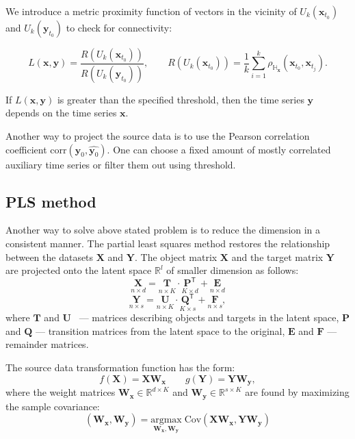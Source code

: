 \documentclass[bst/sn-mathphys]{sn-jnl}%
\newcommand{\bx}{\ensuremath{\mathbf{x}}}
\newcommand{\by}{\mathbf{y}}
\newcommand{\bT}{\mathbf{T}}
\newcommand{\bX}{\mathbf{X}}
\newcommand{\bW}{\mathbf{W}}
\newcommand{\bY}{\mathbf{Y}}
\newcommand{\bU}{\mathbf{U}}
\newcommand{\bQ}{\mathbf{Q}}
\newcommand{\bP}{\mathbf{P}}
\newcommand{\bE}{\mathbf{E}}
\newcommand{\bF}{\mathbf{F}}
\newcommand{\dH}{\mathbb{H}}
\newcommand{\dR}{\mathbb{R}}
\renewcommand{\T}{^{\mathsf{T}}}
\theoremstyle{thmstyleone}%
\theoremstyle{thmstyletwo}%
\theoremstyle{thmstylethree}%
\begin{document}
We introduce a metric proximity function of vectors in the vicinity of $U_k(\bx_{t_0})$ and $U_k(\by_{t_0})$ to check for connectivity:

\begin{equation}
	L(\bx, \by) = \dfrac{R(U_k(\bx_{t_0}))}{R(U_k(\by_{t_0}))}, \qquad R(U_k(\bx_{t_0})) = \dfrac{1}{k} \sum\limits_{i=1}^k \rho_{\dH_{\bx}}(\bx_{t_0}, \bx_{t_j}).
\end{equation}

If $L(\bx,\by)$ is greater than the specified threshold, then the time series $\by$ depends on the time series $\bx$.

Another way to project the source data is to use the Pearson correlation coefficient $\text{corr}(\by_0, \widehat{\by_0})$. 
One can choose a fixed amount of mostly correlated auxiliary time series or filter them out using threshold.

\subsection{PLS method}
Another way to solve above stated problem is to reduce the dimension in a consistent manner.
The partial least squares method restores the relationship between the datasets $\bX$ and $\bY$.
The object matrix $\bX$ and the target matrix $\bY$ are projected onto the latent space $\dR^l$ of smaller dimension as follows:
$$ \underset{n \times d}{\bX} = \underset{n \times K}{\bT} \cdot \underset{K \times d}{\bP\T} + \underset{n \times d}{\bE} $$
$$ \underset{n \times s}{\bY} = \underset{n \times K}{\bU} \cdot \underset{K \times s}{\bQ\T} + \underset{n \times s}{\bF}, $$
where $\bT$ and $\bU$ ~--- matrices describing objects and targets in the latent space, $\bP$ and $\bQ$ --- transition matrices from the latent space to the original, $\bE$ and $\bF$ --- remainder matrices.

The source data transformation function has the form:
$$f(\bX) = \bX\bW_{\bx}\qquad g(\bY) = \bY\bW_{\by}, $$
where the weight matrices $\bW_{\bx} \in \dR^{d \times K}$ and $\bW_{\by}\in \dR^{s \times K}$ are found by maximizing the sample covariance:
$$ (\bW_{\bx}, \bW_{\by}) = \underset{\bW_{\bx}, \bW_{\by}}{\text{argmax}}\; \text{Cov}(\bX\bW_{\bx}, \bY\bW_{\by})$$
\end{document}
